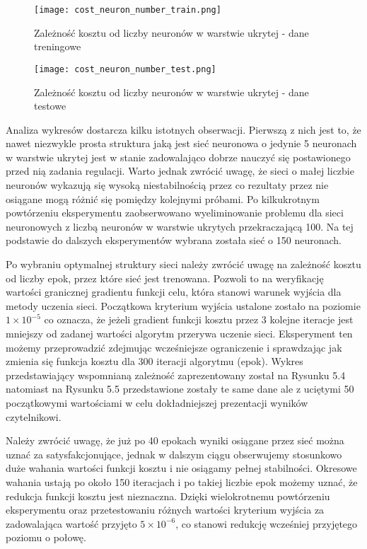 \begin{figure}[!htb]
  \label{fig:Koszt-liczba-neuronow-treningowe}
  \centering \texttt{[image: cost\_neuron\_number\_train.png]}
  \caption{Zależność kosztu od liczby neuronów w warstwie ukrytej - dane treningowe}
\end{figure}

\begin{figure}[!htb]
  \label{fig:Koszt-liczba-neuronow-testowe}
  \centering \texttt{[image: cost\_neuron\_number\_test.png]}
  \caption{Zależność kosztu od liczby neuronów w warstwie ukrytej - dane testowe}
\end{figure}

\par Analiza wykresów dostarcza kilku istotnych obserwacji. Pierwszą z nich jest to, że nawet niezwykle prosta struktura jaką jest sieć neuronowa o jedynie 5 neuronach w warstwie ukrytej jest w stanie zadowalająco dobrze nauczyć się postawionego przed nią zadania regulacji. Warto jednak zwrócić uwagę, że sieci o małej liczbie neuronów wykazują się wysoką niestabilnością przez co rezultaty przez nie osiągane mogą różnić się pomiędzy kolejnymi próbami. Po kilkukrotnym powtórzeniu eksperymentu zaobserwowano wyeliminowanie problemu dla sieci neuronowych z liczbą neuronów w warstwie ukrytych przekraczającą 100. Na tej podstawie do dalszych eksperymentów wybrana została sieć o 150 neuronach. 
\par Po wybraniu optymalnej struktury sieci należy zwrócić uwagę na zależność kosztu od liczby epok, przez które sieć jest trenowana. Pozwoli to na weryfikację wartości granicznej gradientu funkcji celu, która stanowi warunek wyjścia dla metody uczenia sieci. Początkowa kryterium wyjścia ustalone zostało na poziomie \( 1\times10^{-5} \) co oznacza, że jeżeli gradient funkcji kosztu przez 3 kolejne iteracje jest mniejszy od zadanej wartości algorytm przerywa uczenie sieci. Eksperyment ten możemy przeprowadzić zdejmując wcześniejsze ograniczenie i sprawdzając jak zmienia się funkcja kosztu dla 300 iteracji algorytmu (epok). Wykres przedstawiający wspomnianą zależność zaprezentowany został na Rysunku 5.4 natomiast na Rysunku 5.5 przedstawione zostały te same dane ale z uciętymi 50 początkowymi wartościami w celu dokładniejszej prezentacji wyników czytelnikowi.
\par Należy zwrócić uwagę, że już po 40 epokach wyniki osiągane przez sieć można uznać za satysfakcjonujące, jednak w dalszym ciągu obserwujemy stosunkowo duże wahania wartości funkcji kosztu i nie osiągamy pełnej stabilności. Okresowe wahania ustają po około 150 iteracjach i po takiej liczbie epok możemy uznać, że redukcja funkcji kosztu jest nieznaczna. Dzięki wielokrotnemu  powtórzeniu eksperymentu oraz przetestowaniu różnych wartości kryterium wyjścia za zadowalająca wartość przyjęto \( 5\times10^{-6} \), co stanowi redukcję wcześniej przyjętego poziomu o połowę.

